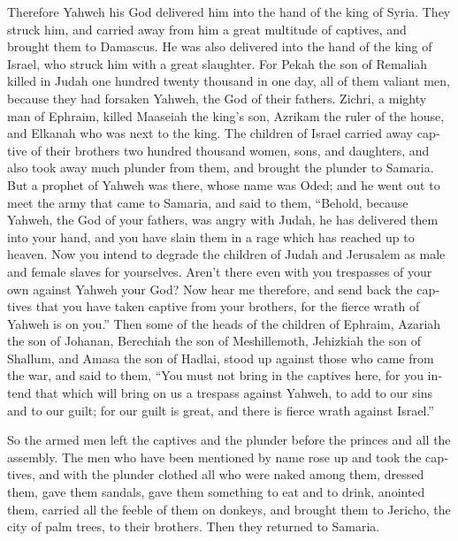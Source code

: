 \begin{paracol}{2}
\begin{otherlanguage}{english}
 Therefore Yahweh his God delivered him into the hand of
the king of Syria. They struck him, and carried away from him a great
multitude of captives, and brought them to Damascus. He was also
delivered into the hand of the king of Israel, who struck him with a
great slaughter.  For Pekah the son of Remaliah killed in
Judah one hundred twenty thousand in one day, all of them valiant men,
because they had forsaken Yahweh, the God of their fathers.
 Zichri, a mighty man of Ephraim, killed Maaseiah the
king's son, Azrikam the ruler of the house, and Elkanah who was next to
the king.  The children of Israel carried away captive of
their brothers two hundred thousand women, sons, and daughters, and also
took away much plunder from them, and brought the plunder to Samaria.
 But a prophet of Yahweh was there, whose name was Oded;
and he went out to meet the army that came to Samaria, and said to them,
``Behold, because Yahweh, the God of your fathers, was angry with Judah,
he has delivered them into your hand, and you have slain them in a rage
which has reached up to heaven.  Now you intend to
degrade the children of Judah and Jerusalem as male and female slaves
for yourselves. Aren't there even with you trespasses of your own
against Yahweh your God?  Now hear me therefore, and send
back the captives that you have taken captive from your brothers, for
the fierce wrath of Yahweh is on you.''  Then some of the
heads of the children of Ephraim, Azariah the son of Johanan, Berechiah
the son of Meshillemoth, Jehizkiah the son of Shallum, and Amasa the son
of Hadlai, stood up against those who came from the war, 
and said to them, ``You must not bring in the captives here, for you
intend that which will bring on us a trespass against Yahweh, to add to
our sins and to our guilt; for our guilt is great, and there is fierce
wrath against Israel.''

 So the armed men left the captives and the plunder
before the princes and all the assembly.  The men who
have been mentioned by name rose up and took the captives, and with the
plunder clothed all who were naked among them, dressed them, gave them
sandals, gave them something to eat and to drink, anointed them, carried
all the feeble of them on donkeys, and brought them to Jericho, the city
of palm trees, to their brothers. Then they returned to Samaria.


\end{otherlanguage}
\end{paracol}
